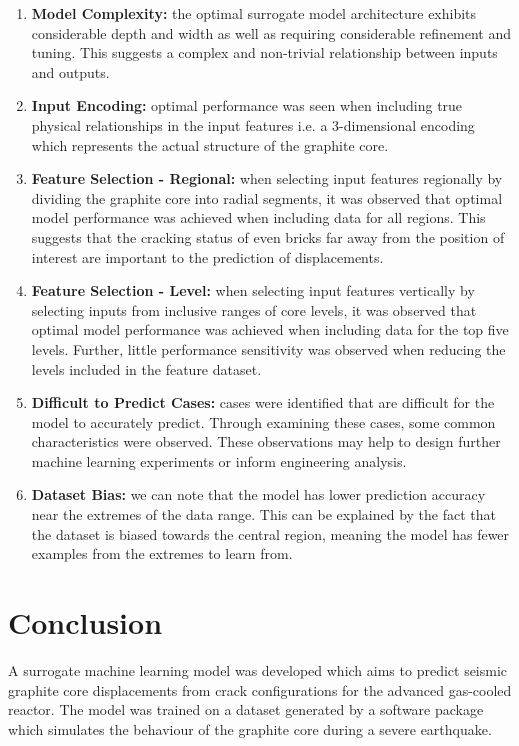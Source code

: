 \begin{enumerate}
	\item \textbf{Model Complexity:} the optimal surrogate model architecture exhibits considerable depth and width as well as requiring considerable refinement and tuning. This suggests a complex and non-trivial relationship between inputs and outputs.
	\item \textbf{Input Encoding:} optimal performance was seen when including true physical relationships in the input features i.e. a 3-dimensional encoding which represents the actual structure of the graphite core.
	\item \textbf{Feature Selection - Regional:} when selecting input features regionally by dividing the graphite core into radial segments, it was observed that optimal model performance was achieved when including data for all regions. This suggests that the cracking status of even bricks far away from the position of interest are important to the prediction of displacements. 
	
	\item \textbf{Feature Selection - Level:} when selecting input features vertically by selecting inputs from inclusive ranges of core levels, it was observed that optimal model performance was achieved when including data for the top five levels. Further, little performance sensitivity was observed when reducing the levels included in the feature dataset.
	
	\item \textbf{Difficult to Predict Cases: } cases were identified that are difficult for the model to accurately predict. Through examining these cases, some common characteristics were observed. These observations may help to design further machine learning experiments or inform engineering analysis.
	\item \textbf{Dataset Bias:} we can note that the model has lower prediction accuracy near the extremes of the data range. This can be explained by the fact that the dataset is biased towards the central region, meaning the model has fewer examples from the extremes to learn from.
\end{enumerate}


\section{Conclusion} \label{conclusion}

A surrogate machine learning model was developed which aims to predict seismic graphite core displacements from crack configurations for the advanced gas-cooled reactor. The model was trained on a dataset generated by a software package which simulates the behaviour of the graphite core during a severe earthquake. 
\\

